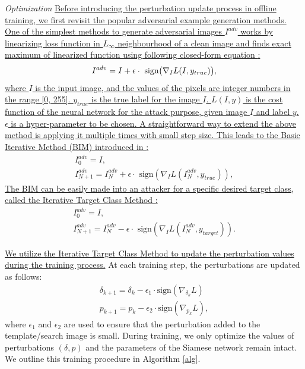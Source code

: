 \documentclass[journal]{IEEEtran}
\begin{document}
\textit{Optimization}
\uline{Before introducing the perturbation update process in offline training, we first revisit the popular adversarial example generation methods. One of the simplest methods to generate adversarial images $I^{adv}$ works by linearizing loss function in $L_{\infty}$ neighbourhood of a clean image and finds exact maximum of linearized function using following closed-form equation \cite{FGSM}:}
\begin{equation}
    I^{adv} = I + \epsilon \cdot \text{ sign} \bigl( \nabla_I L(I, y_{true})  \bigr),
    \vspace{-0.1cm}
\end{equation}
\uline{where $I$ is the input image, and the values of the pixels are integer numbers in the range [0, 255]. $y_{true}$ is the true label for the image $I$. $L(I, y)$ is the cost function of the neural network for the attack purpose, given image $I$ and label $y$. $\epsilon$ is a hyper-parameter to be chosen. A straightforward way to extend the above method is applying it multiple times with small step size. This leads to the Basic Iterative Method (BIM) introduced in \cite{DBLP:conf/iclr/KurakinGB17a}:}
\begin{equation}
    \begin{gathered}
        I_0^{adv} = I, \\
        I_{N+1}^{adv} = I_N^{adv}+\epsilon \cdot \text{ sign}(\nabla_I L(I_N^{adv},y_{true})),
    \end{gathered}
\end{equation}
\uline{The BIM can be easily made into an attacker for a specific desired target class, called the Iterative Target Class Method \cite{DBLP:conf/iclr/KurakinGB17a}:}
\begin{equation}
  \begin{gathered}
      I_0^{adv} = I,\\
      I_{N+1}^{adv} = I_N^{adv}-\epsilon \cdot \text{ sign}(\nabla_I L(I_N^{adv},y_{target})).
  \end{gathered}
  \label{equ:itcm}
\end{equation}

\uline{We utilize the Iterative Target Class Method to update the perturbation values during the training process.}
At each training step, the perturbations are updated as follows:
\begin{gather}
\delta_{k+1} = \delta_{k} - \epsilon_1 \cdot \text{sign}(\nabla_{\delta_k}L)\\
p_{k+1} = p_{k} - \epsilon_2 \cdot \text{sign}(\nabla_{p_k}L),
\end{gather}
where $\epsilon_1$ and $\epsilon_2$ are used to ensure that the perturbation added to the template/search image is small.
During training, we only optimize the values of perturbations $(\delta, p)$ and the parameters of the Siamese network remain intact. We outline this training procedure in Algorithm \ref{alg}.
\end{document}
